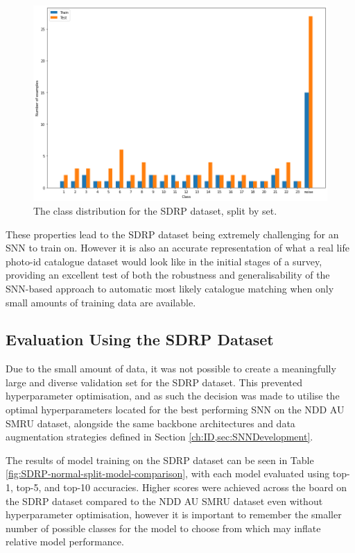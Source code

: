 \begin{figure}[!h]
	\begin{center}
		\includegraphics[scale=0.38]{Chapter7/figs/SDRP-class-dist.png}
	\end{center}
	\caption{The class distribution for the SDRP dataset, split by set.}
	\label{fig:sdrp-dist}
\end{figure}

These properties lead to the SDRP dataset being extremely challenging for an SNN to train on. However it is also an accurate representation of what a real life photo-id catalogue dataset would look like in the initial stages of a survey, providing an excellent test of both the robustness and generalisability of the SNN-based approach to automatic most likely catalogue matching when only small amounts of training data are available. 

\subsection{Evaluation Using the SDRP Dataset}\label{ch:SNNEvaluation,sec:SDRP,sub:SNNEvalWithSDRP}

Due to the small amount of data, it was not possible to create a meaningfully large and diverse validation set for the SDRP dataset. This prevented hyperparameter optimisation, and as such the decision was made to utilise the optimal hyperparameters located for the best performing SNN on the NDD AU SMRU dataset, alongside the same backbone architectures and data augmentation strategies defined in Section \ref{ch:ID,sec:SNNDevelopment}.

The results of model training on the SDRP dataset can be seen in Table \ref{fig:SDRP-normal-split-model-comparison}, with each model evaluated using top-1, top-5, and top-10 accuracies.
Higher scores were achieved across the board on the SDRP dataset compared to the NDD AU SMRU dataset even without hyperparameter optimisation, however it is important to remember the smaller number of possible classes for the model to choose from which may inflate relative model performance.

